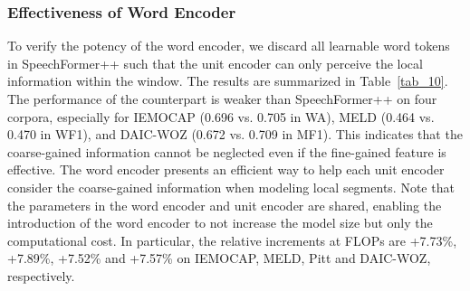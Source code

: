 \documentclass[lettersize,journal]{IEEEtran}
\begin{document}
\subsubsection{Effectiveness of Word Encoder} To verify the potency of the word encoder, we discard all learnable word tokens in SpeechFormer++ such that the unit encoder can only perceive the local information within the window. The results are summarized in Table~\ref{tab_10}. The performance of the counterpart is weaker than SpeechFormer++ on four corpora, especially for IEMOCAP (0.696 vs. 0.705 in WA), MELD (0.464 vs. 0.470 in WF1), and DAIC-WOZ (0.672 vs. 0.709 in MF1). This indicates that the coarse-gained information cannot be neglected even if the fine-gained feature is effective. The word encoder presents an efficient way to help each unit encoder consider the coarse-gained information when modeling local segments. Note that the parameters in the word encoder and unit encoder are shared, enabling the introduction of the word encoder to not increase the model size but only the computational cost. In particular, the relative increments at FLOPs are +7.73\%, +7.89\%, +7.52\% and +7.57\% on IEMOCAP, MELD, Pitt and DAIC-WOZ, respectively.

\begin{table}[!t]
    \caption{Ablation study on merging Block (MB).\\Gain indicates the relative improvement (+) or reduction (-)}
    \label{tab_11}
    \centering
\end{table}
\end{document}
